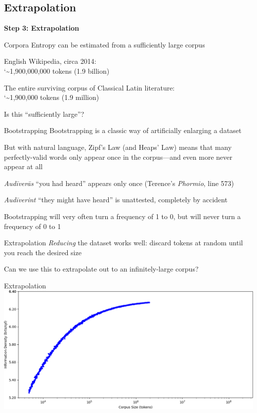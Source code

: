 \documentclass{beamer}
\newcommand{\realtilde}{\char`\~}
\begin{document}
\subsection{Extrapolation}

\begin{frame}{}
\begin{center}
\textbf{\Large Step 3: Extrapolation}
\end{center}
\end{frame}

\begin{frame}{Corpora}
Entropy can be estimated from a sufficiently large corpus

English Wikipedia, circa 2014:\\\quad\realtilde{}1,900,000,000 tokens (1.9 billion)

The entire surviving corpus of Classical Latin literature:\\\quad\realtilde{}1,900,000 tokens (1.9 million)

Is this ``sufficiently large''?
\end{frame}

\begin{frame}{Bootstrapping}
Bootstrapping is a classic way of artificially enlarging a dataset

But with natural language, Zipf's Law (and Heaps' Law) means that many perfectly-valid words only appear once in the corpus---and even more never appear at all

\emph{Audīverās} ``you had heard'' appears only once (Terence's \emph{Phormio}, line 573)

\emph{Audīverint} ``they might have heard'' is unattested, completely by accident

Bootstrapping will very often turn a frequency of 1 to 0, but will never turn a frequency of 0 to 1
\end{frame}

\begin{frame}{Extrapolation}
\emph{Reducing} the dataset works well: discard tokens at random until you reach the desired size

Can we use this to extrapolate out to an infinitely-large corpus?
\end{frame}

\begin{frame}{Extrapolation}
\includegraphics[width=\linewidth]{demo1}

\[\quad\]
\end{frame}
\end{document}
